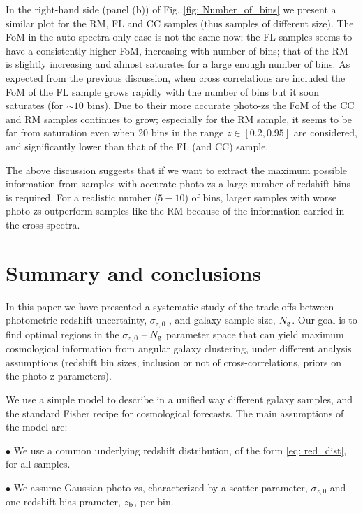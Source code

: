 \documentclass[a4paper,fleqn,usenatbib]{mnras}
\begin{document}
In the right-hand side (panel (b)) of Fig. \ref{fig: Number_of_bins} we present a similar plot for the RM, FL and CC samples (thus samples of different size). The FoM in the auto-spectra only case is not the same now; the FL samples seems to have a consistently higher FoM, increasing with number of bins; that of the RM is slightly increasing and almost saturates for a large enough number of bins.  As expected from the previous discussion, when cross correlations are included the FoM of the FL sample grows rapidly with the number of bins but it soon saturates (for $\sim 10$ bins). Due to their more accurate photo-zs the FoM  of the CC and RM samples continues to grow; especially for the RM sample, it seems to be far from saturation even when 20 bins in the range $z \in [0.2,0.95]$ are considered, and significantly lower than that of the FL (and CC) sample.

The above discussion suggests that if we want to extract the maximum possible information from samples with accurate photo-zs a large number of redshift bins is required. For a realistic number ($5-10$) of bins, larger samples with worse photo-zs outperform samples like the RM because of the information carried in the cross spectra.



\section{Summary and conclusions}
\label{sec: Conclusions}

In this paper we have presented a systematic study of the trade-offs between photometric redshift uncertainty, $\sigma_{z,0}$ , and galaxy sample size, $N_{\mbox{\scriptsize{g}}}$. Our goal is to find optimal regions in the $\sigma_{z,0}$ -- $N_{\mbox{\scriptsize{g}}}$ parameter space that can yield maximum cosmological information from angular galaxy clustering, under different analysis assumptions (redshift bin sizes, inclusion or not of cross-correlations, priors on the photo-z parameters).

We use a simple model to describe in a unified way different galaxy samples, and the standard Fisher recipe for cosmological forecasts. The main assumptions of the model are:

$\bullet$ We use a common underlying redshift distribution, of the form \eqref{eq: red_dist}, for all samples.

$\bullet$ We assume Gaussian photo-zs, characterized by a scatter parameter, $\sigma_{z,0}$ and one redshift bias prameter, $z_{\mbox{\scriptsize{b}}}$, per bin.
\end{document}
